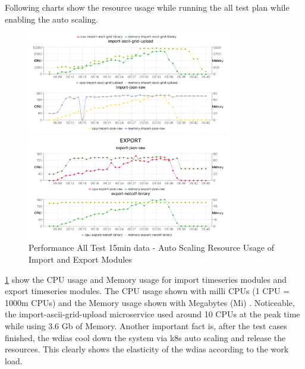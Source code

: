 Following charts show the resource usage while running the all test plan while enabling the auto scaling.
\begin{figure}[htp]
    \centering
    \includegraphics[width=0.8\textwidth]{results/obs/all_auto/obs_all_auto_15m_import_export_res.png}
    \caption{Performance All Test 15min data - Auto Scaling Resource Usage of Import and Export Modules }
    \label{fi:obs_all_auto_15m_import_export_res}
\end{figure}
\ref{fi:obs_all_auto_15m_import_export_res} show the CPU usage and Memory usage for import timeseries modules and export timeseries modules. The CPU usage shown with milli CPUs \cite{LinuxFoundationManagingKubernetes} (1 CPU = 1000m CPUs) and the Memory usage shown with Megabytes (Mi) \cite{LinuxFoundationManagingKubernetes}. Noticeable, the import-ascii-grid-upload microservice used around 10 CPUs at the peak time while using 3.6 Gb of Memory. Another important fact is, after the test cases finished, the \acrshort{wdias} cool down the system via \acrshort{k8s} auto scaling and release the resources. This clearly shows the elasticity of the \acrshort{wdias} according to the work load.

